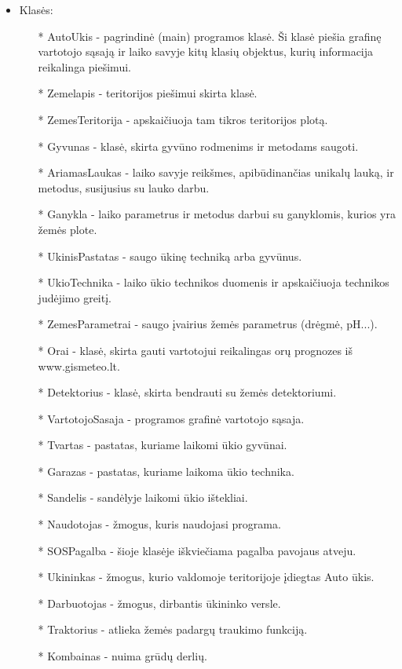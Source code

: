 \documentclass[oneside]{VUMIFPSkursinis}
\begin{document}
\begin{itemize}
	\item Klasės:
		\begin{itemize}
			\item[*] AutoUkis - pagrindinė (main) programos klasė. Ši klasė piešia grafinę vartotojo sąsają ir laiko savyje kitų klasių objektus, kurių informacija reikalinga piešimui.
			\item[*] Zemelapis - teritorijos piešimui skirta klasė.
			\item[*] ZemesTeritorija - apskaičiuoja tam tikros teritorijos plotą.
 			\item[*] Gyvunas - klasė, skirta gyvūno rodmenims ir metodams saugoti.
			\item[*] AriamasLaukas - laiko savyje reikšmes, apibūdinančias unikalų lauką, ir metodus, susijusius su lauko darbu.
			\item[*] Ganykla - laiko parametrus ir metodus darbui su ganyklomis, kurios yra žemės plote.
			\item[*] UkinisPastatas - saugo ūkinę techniką arba gyvūnus.
			\item[*] UkioTechnika - laiko ūkio technikos duomenis ir apskaičiuoja technikos judėjimo greitį.
			\item[*] ZemesParametrai - saugo įvairius žemės parametrus (drėgmė, pH...).
			\item[*] Orai - klasė, skirta gauti vartotojui reikalingas orų prognozes iš www.gismeteo.lt.
			\item[*] Detektorius - klasė, skirta bendrauti su žemės detektoriumi.
			\item[*] VartotojoSasaja - programos grafinė vartotojo sąsaja.
			\item[*] Tvartas - pastatas, kuriame laikomi ūkio gyvūnai.
			\item[*] Garazas - pastatas, kuriame laikoma ūkio technika.
			\item[*] Sandelis - sandėlyje laikomi ūkio ištekliai.
			\item[*] Naudotojas - žmogus, kuris naudojasi programa.
			\item[*] SOSPagalba - šioje klasėje iškviečiama pagalba pavojaus atveju.
			\item[*] Ukininkas - žmogus, kurio valdomoje teritorijoje įdiegtas Auto ūkis.
			\item[*] Darbuotojas - žmogus, dirbantis ūkininko versle.
			\item[*] Traktorius - atlieka žemės padargų traukimo funkciją.
			\item[*] Kombainas - nuima grūdų derlių.

\end{itemize}
\end{itemize}
\end{document}
